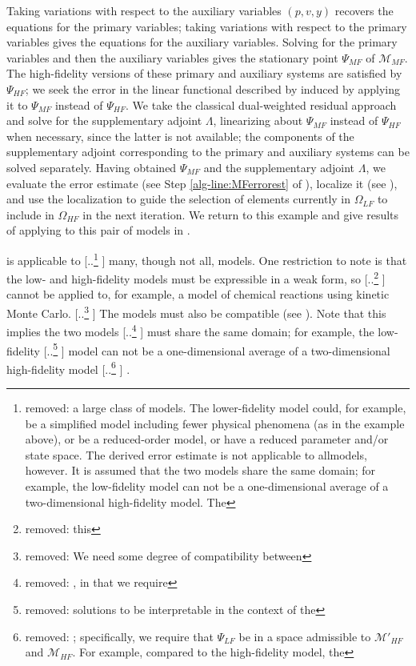 \documentclass[review,sort&compress]{elsarticle}
\theoremstyle{plain} %
\theoremstyle{definition} %
\providecommand{\DIFaddtex}[1]{{\protect\color{blue} \sf #1}} %
\providecommand{\DIFdeltex}[1]{{\protect\color{red} [..\footnote{removed: #1} ]}} %
\providecommand{\DIFaddbegin}{} %
\providecommand{\DIFaddend}{} %
\providecommand{\DIFdelbegin}{} %
\providecommand{\DIFdelend}{} %
\providecommand{\DIFadd}[1]{\texorpdfstring{\DIFaddtex{#1}}{#1}} %
\providecommand{\DIFdel}[1]{\texorpdfstring{\DIFdeltex{#1}}{}} %
\newcommand{\DIFscaledelfig}{0.5}
\newlength{\DIFdelgraphicswidth} %
\newlength{\DIFdelgraphicsheight} %
\newcommand{\DIFaddincludegraphics}[2][]{{\color{blue}\fbox{\DIFOincludegraphics[#1]{#2}}}} %
\newcommand{\DIFdelincludegraphics}[2][]{%
\sbox{\DIFdelgraphicsbox}{\DIFOincludegraphics[#1]{#2}}%
\settoboxwidth{\DIFdelgraphicswidth}{\DIFdelgraphicsbox} %
\settoboxtotalheight{\DIFdelgraphicsheight}{\DIFdelgraphicsbox} %
\scalebox{\DIFscaledelfig}{%
\parbox[b]{\DIFdelgraphicswidth}{\usebox{\DIFdelgraphicsbox}\\[-\baselineskip] \rule{\DIFdelgraphicswidth}{0em}}\llap{\resizebox{\DIFdelgraphicswidth}{\DIFdelgraphicsheight}{%
\setlength{\unitlength}{\DIFdelgraphicswidth}%
\begin{picture}(1,1)%
\thicklines\linethickness{2pt} %
{\color[rgb]{1,0,0}\put(0,0){\framebox(1,1){}}}%
{\color[rgb]{1,0,0}\put(0,0){\line( 1,1){1}}}%
{\color[rgb]{1,0,0}\put(0,1){\line(1,-1){1}}}%
\end{picture}%
}\hspace*{3pt}}} %
} %
\DeclareRobustCommand{\DIFaddbegin}{\DIFOaddbegin \let\includegraphics\DIFaddincludegraphics} %
\DeclareRobustCommand{\DIFaddend}{\DIFOaddend \let\includegraphics\DIFOincludegraphics} %
\DeclareRobustCommand{\DIFdelbegin}{\DIFOdelbegin \let\includegraphics\DIFdelincludegraphics} %
\DeclareRobustCommand{\DIFdelend}{\DIFOaddend \let\includegraphics\DIFOincludegraphics} %
\begin{document}
Taking variations with respect to the auxiliary variables $(p,v,y)$ recovers the equations for the primary variables; taking variations with respect to the primary variables gives the equations for the auxiliary variables. Solving for the primary variables and then the auxiliary variables gives the stationary point $\Psi_{MF}$ of $\mathcal{M}_{MF}$. 
The high-fidelity versions of these primary and auxiliary systems are satisfied by $\Psi_{HF}$; we seek the error in the linear functional described by  induced by applying it to $\Psi_{MF}$ instead of $\Psi_{HF}$. We take the classical dual-weighted residual approach and solve for the supplementary adjoint $\Lambda$, linearizing about $\Psi_{MF}$ instead of $\Psi_{HF}$ when necessary, since the latter is not available; the components of the supplementary adjoint corresponding to the primary and auxiliary systems can be solved separately. Having obtained $\Psi_{MF}$ and the supplementary adjoint $\Lambda$, we evaluate the error estimate (see Step \ref{alg-line:MFerrorest} of ), localize it (see ), and use the localization to guide the selection of elements currently in $\Omega_{LF}$ to include in $\Omega_{HF}$ in the next iteration. We return to this example and give results of applying  to this pair of models in .

 is applicable to \DIFdelbegin \DIFdel{a large class of models. The lower-fidelity model could, for example, be a simplified model including fewer physical phenomena (as in the example above), or be a reduced-order model, or have a reduced parameter and/or state space. The derived error estimate is not applicable to allmodels, however. It is assumed that the two models share the same domain; for example, the low-fidelity model can not be a one-dimensional average of a two-dimensional high-fidelity model. The }\DIFdelend \DIFaddbegin \DIFadd{many, though not all, models. One restriction to note is that the }\DIFaddend low- and high-fidelity models must be expressible in a weak form, so \DIFdelbegin \DIFdel{this }\DIFdelend \DIFaddbegin \DIFadd{ }\DIFaddend cannot be applied to, for example, a model of chemical reactions using kinetic Monte Carlo. \DIFdelbegin \DIFdel{We need some degree of compatibility between }\DIFdelend \DIFaddbegin \DIFadd{The models must also be compatible (see ). Note that this implies }\DIFaddend the two models \DIFdelbegin \DIFdel{, in that we require }\DIFdelend \DIFaddbegin \DIFadd{must share the same domain; for example, }\DIFaddend the low-fidelity \DIFdelbegin \DIFdel{solutions to be interpretable in the context of the }\DIFdelend \DIFaddbegin \DIFadd{model can not be a one-dimensional average of a two-dimensional }\DIFaddend high-fidelity model\DIFdelbegin \DIFdel{; specifically, we require that $\Psi_{LF}$ be in a space admissible to $\mathcal{M}'_{HF}$ and $\mathcal{M}_{HF}$. For example, compared to the high-fidelity model, the }\DIFdelend \DIFaddbegin \DIFadd{. 
}
\end{document}
